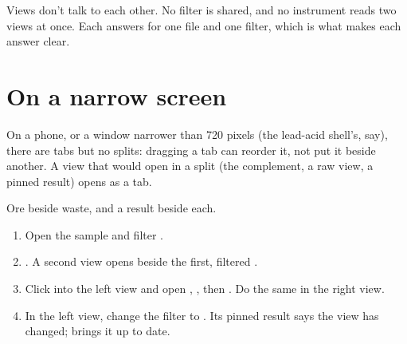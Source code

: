 Views don't talk to each other. No filter is shared, and no instrument reads two views at once. Each
answers for one file and one filter, which is what makes each answer clear.

\section{On a narrow screen}

On a phone, or a window narrower than 720 pixels (the lead-acid shell's, say), there are tabs but no
splits: dragging a tab can reorder it, not put it beside another. A view that would open in a split (the
complement, a raw view, a pinned result) opens as a tab.

\begin{tryit}
Ore beside waste, and a result beside each.
\begin{enumerate}
\item Open the sample and filter .
\item {}. A second view opens beside the first,
filtered .
\item Click into the left view and open , , then .
Do the same in the right view.
\item In the left view, change the filter to . Its pinned result says the view
has changed;  brings it up to date.
\end{enumerate}
\end{tryit}

